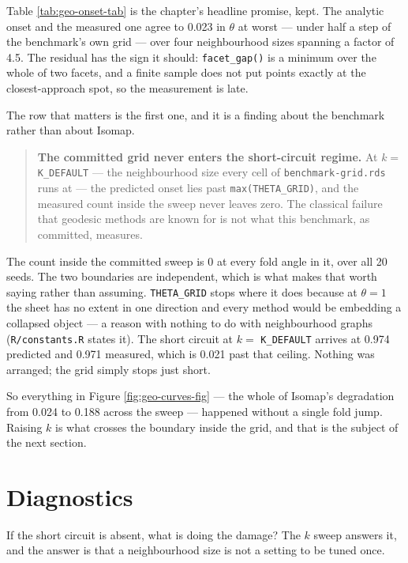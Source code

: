 \documentclass[
  british,
  a4paper,
]{book}
\newenvironment{boximportant}{\begin{quote}}{\end{quote}}
\begin{document}
Table \ref{tab:geo-onset-tab} is the chapter's headline promise, kept. The
analytic onset and the measured one agree to
0.023 in \(\theta\) at worst ---
under half a step of the benchmark's own grid --- over four neighbourhood sizes
spanning a factor of 4.5. The residual has the sign it should:
\texttt{facet\_gap()} is a minimum over the whole of two facets, and a finite sample does
not put points exactly at the closest-approach spot, so the measurement is late.

The row that matters is the first one, and it is a finding about the benchmark
rather than about Isomap.

\begin{boximportant}
\textbf{The committed grid never enters the short-circuit regime.} At
\(k =\) \texttt{K\_DEFAULT} --- the neighbourhood size every cell of
\texttt{benchmark-grid.rds} runs at --- the predicted onset lies past
\texttt{max(THETA\_GRID)}, and the measured count inside the sweep never
leaves zero. The classical failure that geodesic methods are known for
is not what this benchmark, as committed, measures.
\end{boximportant}

The count inside the committed sweep is
0 at every fold angle
in it, over all 20 seeds. The two boundaries are independent, which is
what makes that worth saying rather than assuming. \texttt{THETA\_GRID} stops where it does because at \(\theta = 1\) the sheet
has no extent in one direction and every method would be embedding a collapsed
object --- a reason with nothing to do with neighbourhood graphs (\texttt{R/constants.R}
states it). The short circuit at \(k =\) \texttt{K\_DEFAULT} arrives at
0.974 predicted and
0.971 measured, which is
0.021 past that ceiling. Nothing was
arranged; the grid simply stops just short.

So everything in Figure \ref{fig:geo-curves-fig} --- the whole of Isomap's
degradation from 0.024 to
0.188 across the sweep --- happened without
a single fold jump. Raising \(k\) is what crosses the boundary inside the grid, and
that is the subject of the next section.

\section{Diagnostics}\label{geo-diagnostics}

If the short circuit is absent, what is doing the damage? The \(k\) sweep answers
it, and the answer is that a neighbourhood size is not a setting to be tuned once.
\end{document}
